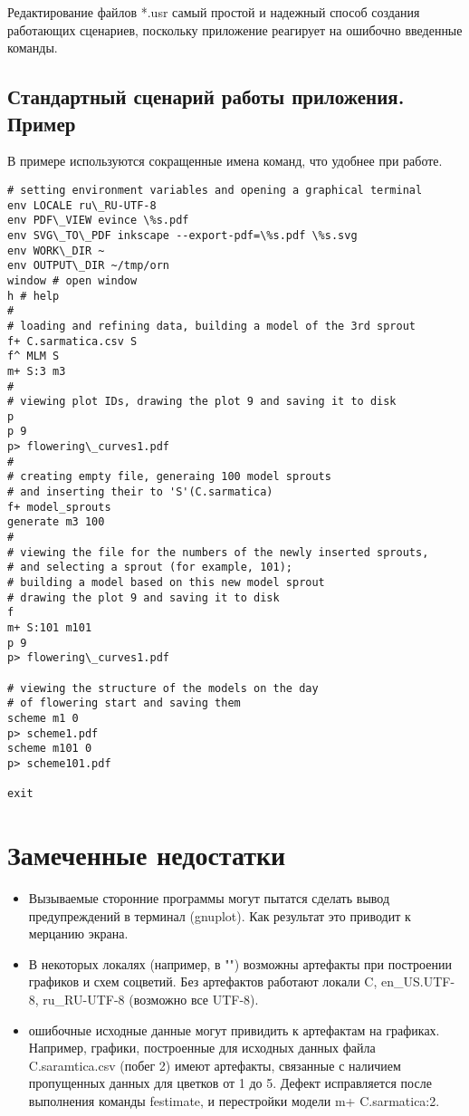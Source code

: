 \documentclass[a4paper]{article}
\begin{document}
Редактирование файлов *.usr самый простой и надежный способ создания работающих сценариев, поскольку приложение реагирует на ошибочно введенные команды.

\subsection{Стандартный сценарий работы приложения. Пример}

В примере используются сокращенные имена команд, что удобнее при работе.
\begin{lstlisting}
# setting environment variables and opening a graphical terminal
env LOCALE ru\_RU-UTF-8
env PDF\_VIEW evince \%s.pdf
env SVG\_TO\_PDF inkscape --export-pdf=\%s.pdf \%s.svg
env WORK\_DIR ~ 
env OUTPUT\_DIR ~/tmp/orn 
window # open window
h # help 
#
# loading and refining data, building a model of the 3rd sprout
f+ C.sarmatica.csv S
f^ MLM S
m+ S:3 m3
#
# viewing plot IDs, drawing the plot 9 and saving it to disk
p 
p 9                                            
p> flowering\_curves1.pdf
#
# creating empty file, generaing 100 model sprouts 
# and inserting their to 'S'(C.sarmatica)
f+ model_sprouts
generate m3 100     
#
# viewing the file for the numbers of the newly inserted sprouts, 
# and selecting a sprout (for example, 101); 
# building a model based on this new model sprout
# drawing the plot 9 and saving it to disk 
f
m+ S:101 m101
p 9
p> flowering\_curves1.pdf

# viewing the structure of the models on the day 
# of flowering start and saving them
scheme m1 0
p> scheme1.pdf
scheme m101 0
p> scheme101.pdf

exit
\end{lstlisting}

\section{Замеченные недостатки}
\begin{itemize}
\item Вызываемые сторонние программы могут пытатся сделать вывод предупреждений в терминал (gnuplot). Как результат это приводит к мерцанию экрана.
\item В некоторых локалях (например, в "") возможны артефакты при построении графиков и схем соцветий. Без артефактов работают локали C, en\_US.UTF-8, ru\_RU-UTF-8 (возможно все UTF-8).
\item ошибочные исходные данные могут привидить к артефактам на графиках. Например, графики, построенные для исходных данных файла C.saramtica.csv (побег 2) имеют артефакты, связанные с наличием пропущенных данных для цветков от 1 до 5. Дефект исправляется после выполнения команды festimate, и перестройки модели m+ C.sarmatica:2.
\end{itemize}
\end{document}
